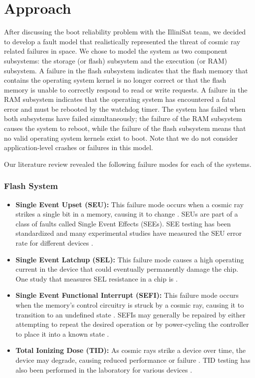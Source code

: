 \section{Approach}\label{sec:approach}

After discussing the boot reliability problem with the IlliniSat team, we decided to develop a fault model that realistically represented the threat of cosmic ray related failures in space.  We chose to model the system as two component subsystems: the storage (or flash) subsystem and the execution (or RAM) subsystem.  A failure in the flash subsystem indicates that the flash memory that contains the operating system kernel is no longer correct or that the flash memory is unable to correctly respond to read or write requests.  A failure in the RAM subsystem indicates that the operating system has encountered a fatal error and must be rebooted by the watchdog timer.  The system has failed when both subsystems have failed simultaneously; the failure of the RAM subsystem causes the system to reboot, while the failure of the flash subsystem means that no valid operating system kernels exist to boot.  Note that we do not consider application-level crashes or failures in this model.

Our literature review revealed the following failure modes for each of the systems.

\subsubsection{Flash System}\label{sec:flashmodel}
\begin{itemize}
  \item {\bf Single Event Upset (SEU):} This failure mode occurs when a cosmic ray strikes a single bit in a memory, causing it to change \cite{Gerardin2010Present}.  SEUs are part of a class of faults called Single Event Effects (SEEs).  SEE testing has been standardized \cite{Schwank2013Radiation} and many experimental studies have measured the SEU error rate for different devices \cite{Langley2004SEE, Oldham2008TID}.
  \item {\bf Single Event Latchup (SEL):} This failure mode causes a high operating current in the device that could eventually permanently damage the chip.  One study that measures SEL resistance in a chip is \cite{Langley2004SEE}.
  \item {\bf Single Event Functional Interrupt (SEFI):} This failure mode occurs when the memory's control circuitry is struck by a cosmic ray, causing it to transition to an undefined state \cite{Langley2004SEE}.  SEFIs may generally be repaired by either attempting to repeat the desired operation or by power-cycling the controller to place it into a known state \cite{Gerardin2010Present}.
  \item {\bf Total Ionizing Dose (TID):} As cosmic rays strike a device over time, the device may degrade, causing reduced performance or failure \cite{Gerardin2010Present}.  TID testing has also been performed in the laboratory for various devices \cite{Oldham2008TID}.
\end{itemize}
